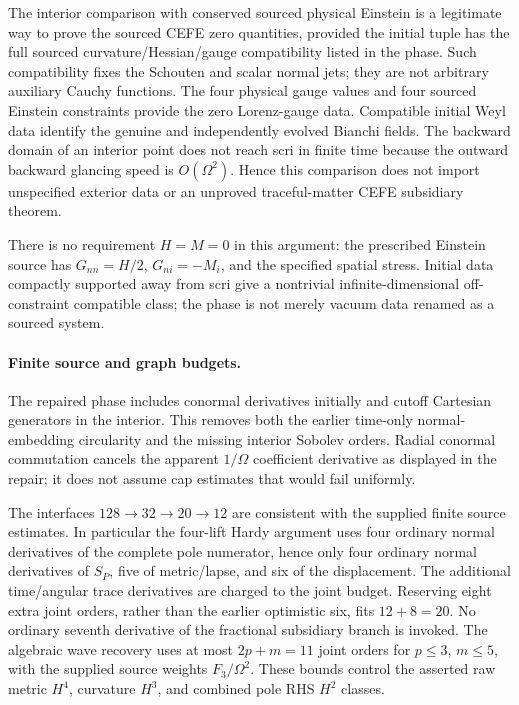 The interior comparison with conserved sourced physical Einstein is a
legitimate way to prove the sourced CEFE zero quantities, provided the
initial tuple has the full sourced curvature/Hessian/gauge compatibility
listed in the phase.  Such compatibility fixes the Schouten and scalar
normal jets; they are not arbitrary auxiliary Cauchy functions.  The four
physical gauge values and four sourced Einstein constraints provide the
zero Lorenz-gauge data.  Compatible initial Weyl data identify the genuine
and independently evolved Bianchi fields.  The backward domain of an
interior point does not reach scri in finite time because the outward
backward glancing speed is $O(\Omega^2)$.  Hence this comparison does not
import unspecified exterior data or an unproved traceful-matter CEFE
subsidiary theorem.

There is no requirement $H=M=0$ in this argument: the prescribed Einstein
source has $G_{nn}=H/2$, $G_{ni}=-M_i$, and the specified spatial stress.
Initial data compactly supported away from scri give a nontrivial
infinite-dimensional off-constraint compatible class; the phase is not
merely vacuum data renamed as a sourced system.

\paragraph{Finite source and graph budgets.}
The repaired phase includes conormal derivatives initially and cutoff
Cartesian generators in the interior.  This removes both the earlier
time-only normal-embedding circularity and the missing interior Sobolev
orders.  Radial conormal commutation cancels the apparent
$1/\Omega$ coefficient derivative as displayed in the repair; it does not
assume cap estimates that would fail uniformly.

The interfaces $128\to32\to20\to12$ are consistent with the supplied
finite source estimates.  In particular the four-lift Hardy argument uses
four ordinary normal derivatives of the complete pole numerator, hence
only four ordinary normal derivatives of $S_P$, five of metric/lapse,
and six of the displacement.  The additional time/angular trace
derivatives are charged to the joint budget.  Reserving eight extra joint
orders, rather than the earlier optimistic six, fits $12+8=20$.
No ordinary seventh derivative of the fractional subsidiary branch is
invoked.  The algebraic wave recovery uses at most $2p+m=11$ joint orders
for $p\le3$, $m\le5$, with the supplied source weights
$F_3/\Omega^2$.  These bounds control the asserted raw metric $H^4$,
curvature $H^3$, and combined pole RHS $H^2$ classes.


